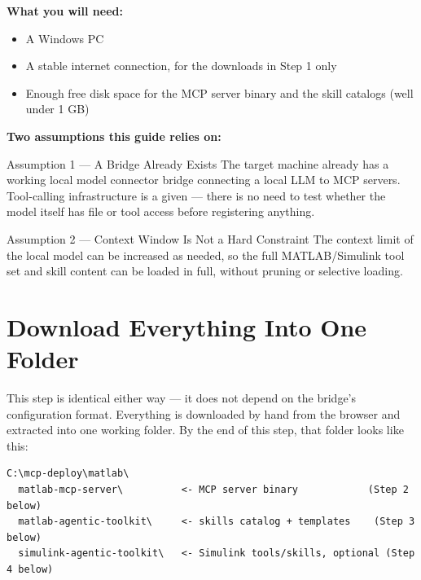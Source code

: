\documentclass[11pt, letterpaper]{article}
\begin{document}
\textbf{What you will need:}
\begin{itemize}
  \item A Windows PC
  \item A stable internet connection, for the downloads in Step 1 only
  \item Enough free disk space for the MCP server binary and the skill catalogs (well under 1 GB)
\end{itemize}

\textbf{Two assumptions this guide relies on:}

\begin{assumptionbox}{Assumption 1 --- A Bridge Already Exists}
  The target machine already has a working local model connector bridge connecting a local LLM
  to MCP servers. Tool-calling infrastructure is a given --- there is no need to test whether the
  model itself has file or tool access before registering anything.
\end{assumptionbox}

\begin{assumptionbox}{Assumption 2 --- Context Window Is Not a Hard Constraint}
  The context limit of the local model can be increased as needed, so the full MATLAB/Simulink
  tool set and skill content can be loaded in full, without pruning or selective loading.
\end{assumptionbox}


\section{Download Everything Into One Folder}

This step is identical either way --- it does not depend on the bridge's configuration format.
Everything is downloaded by hand from the browser and extracted into one working folder. By the
end of this step, that folder looks like this:

\begin{codeblock}
\begin{Verbatim}
C:\mcp-deploy\matlab\
  matlab-mcp-server\          <- MCP server binary            (Step 2 below)
  matlab-agentic-toolkit\     <- skills catalog + templates    (Step 3 below)
  simulink-agentic-toolkit\   <- Simulink tools/skills, optional (Step 4 below)
\end{Verbatim}
\end{codeblock}
\end{document}
